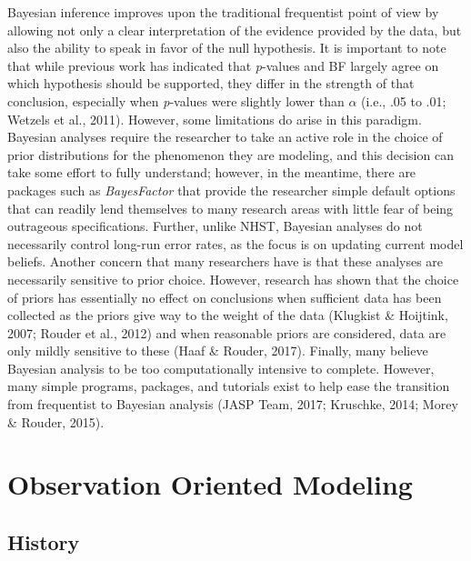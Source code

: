 \documentclass[english,man]{apa6}
\theoremstyle{definition}
\theoremstyle{definition}
\theoremstyle{definition}
\theoremstyle{remark}
\begin{document}
Bayesian inference improves upon the traditional frequentist point of
view by allowing not only a clear interpretation of the evidence
provided by the data, but also the ability to speak in favor of the null
hypothesis. It is important to note that while previous work has
indicated that \emph{p}-values and BF largely agree on which hypothesis
should be supported, they differ in the strength of that conclusion,
especially when \emph{p}-values were slightly lower than \(\alpha\)
(i.e., .05 to .01; Wetzels et al., 2011). However, some limitations do
arise in this paradigm. Bayesian analyses require the researcher to take
an active role in the choice of prior distributions for the phenomenon
they are modeling, and this decision can take some effort to fully
understand; however, in the meantime, there are packages such as
\emph{BayesFactor} that provide the researcher simple default options
that can readily lend themselves to many research areas with little fear
of being outrageous specifications. Further, unlike NHST, Bayesian
analyses do not necessarily control long-run error rates, as the focus
is on updating current model beliefs. Another concern that many
researchers have is that these analyses are necessarily sensitive to
prior choice. However, research has shown that the choice of priors has
essentially no effect on conclusions when sufficient data has been
collected as the priors give way to the weight of the data (Klugkist \&
Hoijtink, 2007; Rouder et al., 2012) and when reasonable priors are
considered, data are only mildly sensitive to these (Haaf \& Rouder,
2017). Finally, many believe Bayesian analysis to be too computationally
intensive to complete. However, many simple programs, packages, and
tutorials exist to help ease the transition from frequentist to Bayesian
analysis (JASP Team, 2017; Kruschke, 2014; Morey \& Rouder, 2015).

\section{Observation Oriented
Modeling}\label{observation-oriented-modeling}

\subsection{History}\label{history-2}
\end{document}
